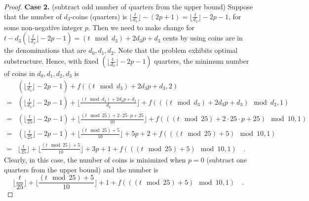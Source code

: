 \begin{proof}
    \textbf{Case 2. } (subtract odd number of quarters from the upper bound) 
    Suppose that the number of $d_3$-coins (quarters) is 
    $\lfloor \frac{t}{d_3} \rfloor - (2p + 1) = \lfloor \frac{t}{d_3} \rfloor - 2p - 1$, 
    for some non-negative integer $p$.
    Then we need to make change for 
    $t - d_3 (\lfloor \frac{t}{d_3} \rfloor - 2p - 1) = (t \mod d_3) + 2 d_3 p + d_3$ cents 
    by using coins are in the denominations that are $d_0, d_1, d_2$.
    Note that the problem exhibits optimal substructure.
    Hence, with fixed $(\lfloor \frac{t}{d_3} \rfloor - 2p - 1)$ quarters, 
    the minimum number of coins in $d_0, d_1, d_2, d_3$ is 
    \begin{equation*}
    \begin{split}
        & (\lfloor \frac{t}{d_3} \rfloor - 2p - 1) + f((t \mod d_3) + 2 d_3 p + d_3, 2) \\
        = & (\lfloor \frac{t}{d_3} \rfloor - 2p - 1) 
        + \lfloor \frac{(t \mod d_3) + 2 d_3 p + d_3}{d_2} \rfloor 
        + f(((t \mod d_3) + 2 d_3 p + d_3) \mod d_2, 1) \\
        = & (\lfloor \frac{t}{25} \rfloor - 2p - 1) 
        + \lfloor \frac{(t \mod 25) + 2 \cdot 25 \cdot p + 25}{10} \rfloor 
        + f(((t \mod 25) + 2 \cdot 25 \cdot p + 25) \mod 10, 1) \\
        = & (\lfloor \frac{t}{25} \rfloor - 2p - 1) 
        + \lfloor \frac{(t \mod 25) + 5}{10} \rfloor + 5 p + 2 
        + f(((t \mod 25) + 5) \mod 10, 1) \\
        = & \lfloor \frac{t}{25} \rfloor 
        + \lfloor \frac{(t \mod 25) + 5}{10} \rfloor + 3 p + 1 
        + f(((t \mod 25) + 5) \mod 10, 1) 
        \quad .
    \end{split}
    \end{equation*}
    Clearly, in this case, the number of coins is minimized when $p = 0$ 
    (subtract one quarters from the upper bound) and the number is 
    \begin{equation*}
        \lfloor \frac{t}{25} \rfloor 
        + \lfloor \frac{(t \mod 25) + 5}{10} \rfloor + 1 
        + f(((t \mod 25) + 5) \mod 10, 1) 
        \quad .
    \end{equation*}


\end{proof}
